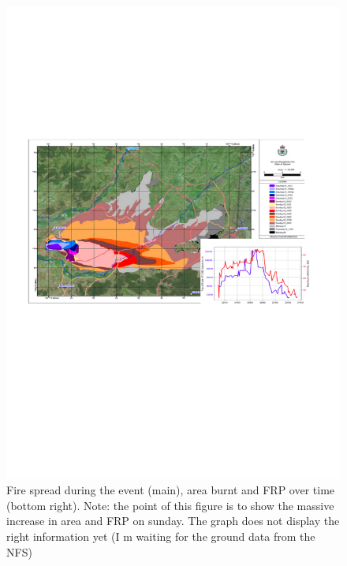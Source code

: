 \documentclass[12pt]{article}
\begin{document}
\begin{figure}[position]
   \caption{\label{ground_fire} Fire spread during the event (main), area burnt and FRP over time (bottom right).   {\color{red} Note: the point of this figure is to show the massive increase in area and FRP on sunday. The graph does not display the right information yet (I m waiting for the ground data from the NFS)} }
   \includegraphics[width=\textwidth]{figures/ground_fire.png}
\end{figure}
\end{document}
